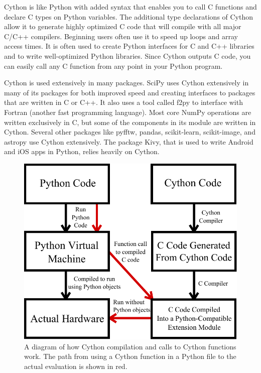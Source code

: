 Cython is like Python with added syntax that enables you to call C functions and declare C types on Python variables.
The additional type declarations of Cython allow it to generate highly optimized C code that will compile with all major C/C++ compilers.
Beginning users often use it to speed up loops and array access times.
It is often used to create Python interfaces for C and C++ libraries and to write well-optimized Python libraries.
Since Cython outputs C code, you can easily call any C function from any point in your Python program.

Cython is used extensively in many packages.
SciPy uses Cython extensively in many of its packages for both improved speed and creating interfaces to packages that are written in C or C++.
It also uses a tool called f2py to interface with Fortran (another fast programming language).
Most core NumPy operations are written exclusively in C, but some of the components in its  module are written in Cython.
Several other packages like pyfftw, pandas, scikit-learn, scikit-image, and astropy use Cython extensively.
The package Kivy, that is used to write Android and iOS apps in Python, relies heavily on Cython.

\begin{figure}
\centering
\includegraphics[width=\textwidth]{compilation.pdf}
\caption{A diagram of how Cython compilation and calls to Cython functions work.
The path from using a Cython function in a Python file to the actual evaluation is shown in red.}
\label{cython:compilation}
\end{figure}


